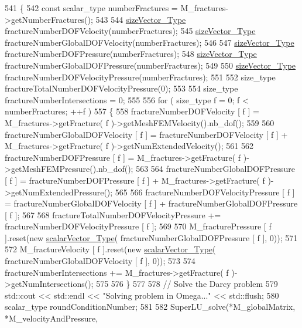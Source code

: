 \begin{DoxyCode}
541 \{  
542     \textcolor{keyword}{const} scalar\_type numberFractures = M\_fractures->getNumberFractures();
543    
544     \hyperlink{Core_8h_a83c51913d041a5001e8683434c09857f}{sizeVector\_Type} fractureNumberDOFVelocity(numberFractures);
545     \hyperlink{Core_8h_a83c51913d041a5001e8683434c09857f}{sizeVector\_Type} fractureNumberGlobalDOFVelocity(numberFractures);
546 
547     \hyperlink{Core_8h_a83c51913d041a5001e8683434c09857f}{sizeVector\_Type} fractureNumberDOFPressure(numberFractures);
548     \hyperlink{Core_8h_a83c51913d041a5001e8683434c09857f}{sizeVector\_Type} fractureNumberGlobalDOFPressure(numberFractures);
549 
550     \hyperlink{Core_8h_a83c51913d041a5001e8683434c09857f}{sizeVector\_Type} fractureNumberDOFVelocityPressure(numberFractures);
551 
552     size\_type fractureTotalNumberDOFVelocityPressure(0);
553 
554     size\_type fractureNumberIntersections = 0;
555 
556     \textcolor{keywordflow}{for} ( size\_type f = 0; f < numberFractures; ++f )
557     \{
558         fractureNumberDOFVelocity [ f ] = M\_fractures->getFracture( f )->getMeshFEMVelocity().nb\_dof();
559 
560         fractureNumberGlobalDOFVelocity [ f ] = fractureNumberDOFVelocity [ f ] + M\_fractures->getFracture(
       f )->getNumExtendedVelocity();
561 
562         fractureNumberDOFPressure [ f ] = M\_fractures->getFracture( f )->getMeshFEMPressure().nb\_dof();
563 
564         fractureNumberGlobalDOFPressure [ f ] = fractureNumberDOFPressure [ f ] + M\_fractures->getFracture(
       f )->getNumExtendedPressure();
565 
566         fractureNumberDOFVelocityPressure [ f ] = fractureNumberGlobalDOFVelocity [ f ] + 
      fractureNumberGlobalDOFPressure [ f ];
567 
568         fractureTotalNumberDOFVelocityPressure += fractureNumberDOFVelocityPressure [ f ];
569 
570         M\_fracturePressure [ f ].reset(\textcolor{keyword}{new} \hyperlink{Core_8h_a4e75b5863535ba1dd79942de2846eff0}{scalarVector\_Type}( 
      fractureNumberGlobalDOFPressure [ f ], 0));
571 
572         M\_fractureVelocity [ f ].reset(\textcolor{keyword}{new} \hyperlink{Core_8h_a4e75b5863535ba1dd79942de2846eff0}{scalarVector\_Type}( 
      fractureNumberGlobalDOFVelocity [ f ], 0));
573 
574         fractureNumberIntersections += M\_fractures->getFracture( f )->getNumIntersections();
575 
576     \}
577 
578     \textcolor{comment}{// Solve the Darcy problem}
579     std::cout << std::endl << \textcolor{stringliteral}{"Solving problem in Omega..."} << std::flush;
580     scalar\_type roundConditionNumber;
581 
582     SuperLU\_solve(*M\_globalMatrix, *M\_velocityAndPressure,

\end{DoxyCode}
